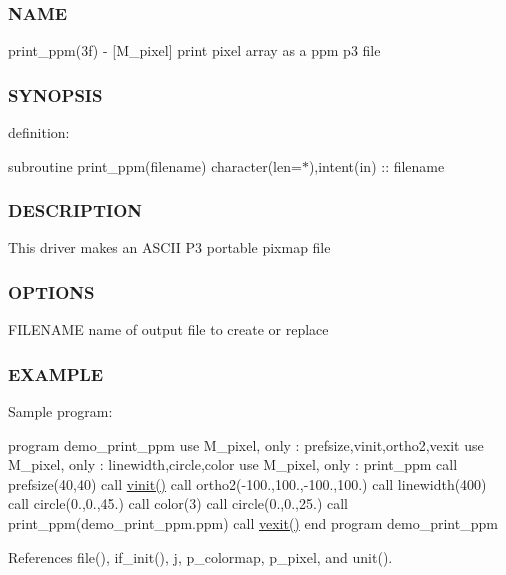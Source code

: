 \subsubsection*{N\+A\+ME}

print\+\_\+ppm(3f) -\/ \mbox{[}M\+\_\+pixel\mbox{]} print pixel array as a ppm p3 file 

\subsubsection*{S\+Y\+N\+O\+P\+S\+IS}

definition\+:

subroutine print\+\_\+ppm(filename) character(len=$\ast$),intent(in) \+:\+: filename

\subsubsection*{D\+E\+S\+C\+R\+I\+P\+T\+I\+ON}

This driver makes an A\+S\+C\+II P3 portable pixmap file

\subsubsection*{O\+P\+T\+I\+O\+NS}

F\+I\+L\+E\+N\+A\+ME name of output file to create or replace

\subsubsection*{E\+X\+A\+M\+P\+LE}

Sample program\+:

program demo\+\_\+print\+\_\+ppm use M\+\_\+pixel, only \+: prefsize,vinit,ortho2,vexit use M\+\_\+pixel, only \+: linewidth,circle,color use M\+\_\+pixel, only \+: print\+\_\+ppm call prefsize(40,40) call \hyperlink{namespacem__pixel_ac03ca8f23fdadb60599b6ea4dc87a6d9}{vinit()} call ortho2(-\/100.,100.,-\/100.,100.) call linewidth(400) call circle(0.,0.,45.) call color(3) call circle(0.,0.,25.) call print\+\_\+ppm(\textquotesingle{}demo\+\_\+print\+\_\+ppm.\+ppm\textquotesingle{}) call \hyperlink{namespacem__pixel_a19ad6b65752322b0029a62cc0ebec3e8}{vexit()} end program demo\+\_\+print\+\_\+ppm 

References file(), if\+\_\+init(), j, p\+\_\+colormap, p\+\_\+pixel, and unit().

